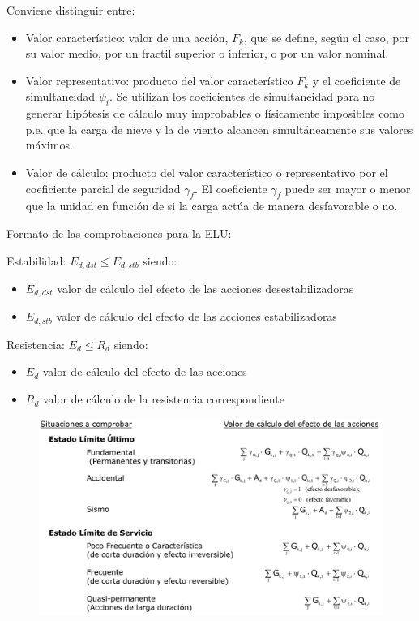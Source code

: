 Conviene distinguir entre:
\begin{itemize}
    \item Valor característico: valor de una acción, $F_k$, que se define, según el caso, por su valor medio, por un fractil superior o inferior, o por un valor nominal.
    \item Valor representativo: producto del valor característico $F_k$ y el coeficiente de simultaneidad $\psi_i$. Se utilizan los coeficientes de simultaneidad para no generar hipótesis de cálculo muy improbables o físicamente imposibles como p.e. que la carga de nieve y la de viento alcancen simultáneamente sus valores máximos.
    \item Valor de cálculo: producto del valor característico o representativo por el coeficiente parcial de seguridad $\gamma_f$. El coeficiente $\gamma_f$ puede ser mayor o menor que la unidad en función de si la carga actúa de manera desfavorable o no.
\end{itemize}

Formato de las comprobaciones para la ELU:

Estabilidad: $E_{d, dst} \leq E_{d, stb}$
siendo:
\begin{itemize}
    \item $E_{d, dst}$ valor de cálculo del efecto de las acciones desestabilizadoras
    \item $E_{d, stb}$ valor de cálculo del efecto de las acciones estabilizadoras
\end{itemize}

Resistencia: $E_d \leq R_d$
siendo:
\begin{itemize}
    \item $E_d$ valor de cálculo del efecto de las acciones
    \item $R_d$ valor de cálculo de la resistencia correspondiente
\end{itemize}

\begin{figure}[H]
    \centering
    \includegraphics[width = 0.5 \textwidth]{Imagenes/Implementacion a nivel normativo - Situaciones a comprobar.png}
\end{figure}

